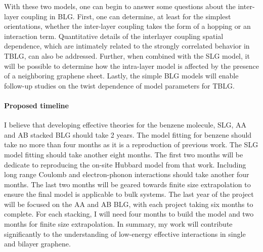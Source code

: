 \documentclass[12pt]{article}
\begin{document}
With these two models, one can begin to answer some questions about the inter-layer coupling in BLG.
First, one can determine, at least for the simplest orientations, whether the inter-layer coupling takes the form of a hopping or an interaction term.
Quantitative details of the interlayer coupling spatial dependence, which are intimately related to the strongly correlated behavior in TBLG, can also be addressed.
Further, when combined with the SLG model, it will be possible to determine how the intra-layer model is affected by the presence of a neighboring graphene sheet.
Lastly, the simple BLG models will enable follow-up studies on the twist dependence of model parameters for TBLG.

\vspace{-10pt}
\paragraph{Proposed timeline} I believe that developing effective theories for the benzene molecule, SLG, AA and AB stacked BLG should take 2 years. 
The model fitting for benzene should take no more than four months as it is a reproduction of previous work.
The SLG model fitting should take another eight months.
The first two months will be dedicate to reproducing the on-site Hubbard model from that work.
Including long range Coulomb and electron-phonon interactions should take another four months.
The last two months will be geared towards finite size extrapolation to ensure the final model is applicable to bulk systems.
The last year of the project will be focused on the AA and AB BLG, with each project taking six months to complete.
For each stacking, I will need four months to build the model and two months for finite size extrapolation.
In summary, my work will contribute significantly to the understanding of low-energy effective interactions in single and bilayer graphene.

\vspace{-10pt}
\begin{multicols}{2}
\begin{spacing}{0.2}
{\fontsize{5}{12}\selectfont


}
\end{spacing}
\end{multicols}
\end{document}
